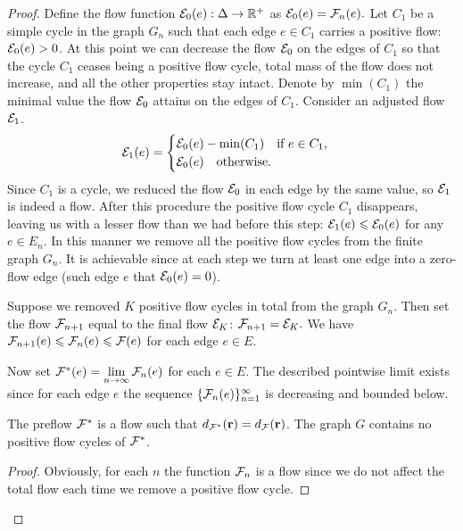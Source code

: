 \documentclass[12pt,oneside,a4paper]{amsart}
\begin{document}
\begin{proof}
        Define the flow function $\cal{E}_0(e): \net \to \mathbb{R}^{+}$ as $\cal{E}_0(e) = \flowposn{n}(e).$
        Let $C_1$ be a simple cycle in the graph $G_n$ such that each edge $e \in C_1$ carries
          a positive flow: $\cal{E}_0(e) > 0$.
        At this point we can decrease the flow $\cal{E}_0$ on the edges of $C_1$ so that the cycle $C_1$
          ceases being a positive flow cycle, total mass of the flow does not increase, and all the other properties stay intact.
        Denote by $\min(C_1)$ the minimal value the flow $\cal{E}_0$ attains on the edges of $C_1$.
        Consider an adjusted flow $\cal{E}_1$.
        \begin{equation*}
          \cal{E}_1(e) =
          \begin{cases}
            \cal{E}_0(e) - \min(C_1) \quad \text{if } e \in C_1,\\
            \cal{E}_0(e) \quad \text{otherwise}.
          \end{cases}
        \end{equation*}
        Since $C_1$ is a cycle, we reduced the flow $\cal{E}_0$ in each edge by the same value,
          so $\cal{E}_1$ is indeed a flow.
        After this procedure the positive flow cycle $C_1$ disappears,
          leaving us with a lesser flow than we had before this step: $\cal{E}_1(e) \leq \cal{E}_0(e)$ for any $e \in E_n.$
        In this manner we remove all the positive flow cycles from the finite graph $G_n$.
        It is achievable since at each step we turn at least one edge into a zero-flow edge (such edge $e$ that $\cal{E}_0(e) = 0$).

        Suppose we removed $K$ positive flow cycles in total from the graph $G_n$.
        Then set the flow $\flowposn{n+1}$ equal to the final flow $\cal{E}_K$: $\flowposn{n+1} = \cal{E}_K.$
        We have $\flowposn{n+1}(e) \leq \flowposn{n}(e) \leq \flowpos(e)$ for each edge $e \in E$.

        Now set $\preflow(e) = \lim\limits_{n \to \infty} \flowposn{n}(e)$ for each $e \in E$.
        The described pointwise limit exists since for each edge $e$ the sequence $\{\flowposn{n}(e)\}_{n=1}^\infty$ is decreasing and bounded below.
        \begin{prop}
          The preflow $\preflow$ is a flow such that $d_{\preflow}(\root) = d_{\flowpos}(\root)$.
          The graph $G$ contains no positive flow cycles of $\preflow$.
        \end{prop}
        \begin{proof}
          Obviously, for each $n$ the function $\flowposn{n}$ is a flow since we do not affect the total flow each time we remove a positive flow cycle.


\end{proof}
\end{proof}
\end{document}
